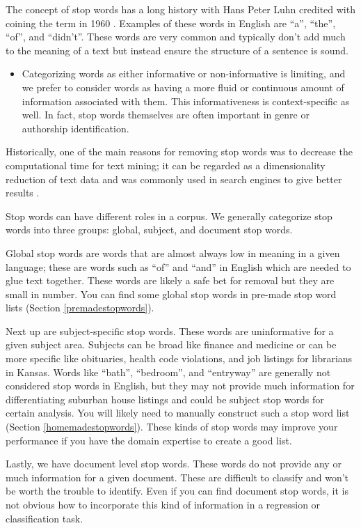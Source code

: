 \documentclass[
]{krantz}
\newenvironment{rmdblock}[1]
  {\begin{shaded*}
  \begin{itemize}[left = -1cm, labelsep = 1cm]
  \renewcommand{\labelitemi}{
    \raisebox{-.7\height}[0pt][0pt]{
      {\setkeys{Gin}{width=3em,keepaspectratio}\texttt{[image: images/\#1]}}
    }
  }
 
  \item
  }
  {
  \end{itemize}
  \end{shaded*}
  }
\newenvironment{rmdnote}
  {\begin{rmdblock}{note}}
  {\end{rmdblock}}
\begin{document}
The concept of stop words has a long history with Hans Peter Luhn credited with coining the term in 1960 \citep{Luhn1960}. Examples of these words in English are ``a'', ``the'', ``of'', and ``didn't''. These words are very common and typically don't add much to the meaning of a text but instead ensure the structure of a sentence is sound.

\begin{rmdnote}
Categorizing words as either informative or non-informative is limiting,
and we prefer to consider words as having a more fluid or continuous
amount of information associated with them. This informativeness is
context-specific as well. In fact, stop words themselves are often
important in genre or authorship identification.
\end{rmdnote}

Historically, one of the main reasons for removing stop words was to decrease the computational time for text mining; it can be regarded as a dimensionality reduction of text data and was commonly used in search engines to give better results \citep{Huston2010}.

Stop words can have different roles in a corpus. We generally categorize stop words into three groups: global, subject, and document stop words.

Global stop words are words that are almost always low in meaning in a given language; these are words such as ``of'' and ``and'' in English which are needed to glue text together. These words are likely a safe bet for removal but they are small in number. You can find some global stop words in pre-made stop word lists (Section \ref{premadestopwords}).

Next up are subject-specific stop words. These words are uninformative for a given subject area. Subjects can be broad like finance and medicine or can be more specific like obituaries, health code violations, and job listings for librarians in Kansas.
Words like ``bath'', ``bedroom'', and ``entryway'' are generally not considered stop words in English, but they may not provide much information for differentiating suburban house listings and could be subject stop words for certain analysis. You will likely need to manually construct such a stop word list (Section \ref{homemadestopwords}). These kinds of stop words may improve your performance if you have the domain expertise to create a good list.

Lastly, we have document level stop words. These words do not provide any or much information for a given document. These are difficult to classify and won't be worth the trouble to identify. Even if you can find document stop words, it is not obvious how to incorporate this kind of information in a regression or classification task.
\end{document}
